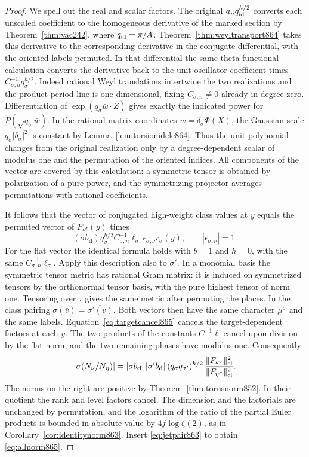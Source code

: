 \documentclass[a4paper,11pt]{article}
\theoremstyle{definition}
\theoremstyle{remark}
\numberwithin{equation}{section}
\begin{document}
\begin{proof}
We spell out the real and scalar factors. The original
\(a_n q_{\rm id}^{h/2}\) converts each unscaled coefficient
to the homogeneous derivative of the marked section by
Theorem~\ref{thm:vac242}, where \(q_{\rm id}=\pi/A\).
Theorem~\ref{thm:weyltransport864} takes this derivative to
the corresponding derivative in the conjugate differential,
with the oriented labels permuted. In that differential the
same theta-functional calculation converts the derivative
back to the unit oscillator coefficient times
\(C_{\sigma,n}^{-1}q_\sigma^{h/2}\). Indeed rational Weyl
translations intertwine the two realizations and the product
period line is one dimensional, fixing \(C_{\sigma,n}\ne0\)
already in degree zero. Differentiation of
\(\exp(q_\sigma\bar w\cdot Z)\) gives exactly the indicated
power for \(P(\sqrt{q_\sigma}\bar w)\). In the rational matrix
coordinates \(w=\delta_\sigma\Phi(X)\), the Gaussian scale
\(q_\sigma|\delta_\sigma|^2\) is constant by
Lemma~\ref{lem:torsionidele864}. Thus the unit polynomial
changes from the original realization only by a degree-dependent
scalar of modulus one and the permutation of the oriented
indices. All components of the vector are covered by this
calculation: a symmetric tensor is obtained by polarization
of a pure power, and the symmetrizing projector averages
permutations with rational coefficients.

It follows that the vector of conjugated high-weight class
values at \(y\) equals the permuted vector of \(F_{\nu^\sigma}(y)\)
times
\[
  (\sigma b_{\mathbf d})q_\sigma^{h/2}
     C_{\sigma,n}^{-1}\ell_\sigma\,
                \epsilon_{\sigma,\nu}r_\sigma(y),
       \qquad |\epsilon_{\sigma,\nu}|=1.
\]
For the flat vector the identical formula holds with \(b=1\)
and \(h=0\), with the same \(C_{\sigma,n}^{-1}\ell_\sigma\).
Apply this description also to \(\sigma'\). In a monomial
basis the symmetric tensor metric has rational Gram matrix:
it is induced on symmetrized tensors by the orthonormal tensor
basis, with the pure highest tensor of norm one. Tensoring
over \(\tau\) gives the same metric after permuting the places.
In the class pairing \(\sigma(\bar v)=\overline{\sigma'(v)}\).
Both vectors then have the same character \(\mu^\sigma\) and
the same labels. Equation~\eqref{eq:targetcancel865} cancels
the target-dependent factors at each \(y\). The two products
of the constants \(C^{-1}\ell\) cancel upon division by the
flat norm, and the two remaining phases have modulus one.
Consequently
\[
 |\sigma(N_\nu/N_\eta)|=
    |\sigma b_{\mathbf d}|\,|\sigma' b_{\mathbf d}|\,
       (q_\sigma q_{\sigma'})^{h/2}\,
       \frac{\|F_{\nu^\sigma}\|_{\rm cl}^2}
            {\|F_{\eta^\sigma}\|_{\rm cl}^2}.
\]
The norms on the right are positive by
Theorem~\ref{thm:torusnorm852}. In their quotient the rank and
level factors cancel. The dimension and the factorials are
unchanged by permutation, and the logarithm of the ratio of
the partial Euler products is bounded in absolute value by
\(4f\log\zeta(2)\), as in Corollary~\ref{cor:identitynorm863}.
Insert \eqref{eq:jetpair863} to obtain \eqref{eq:allnorm865}.
\end{proof}
\clearpage
\end{document}
